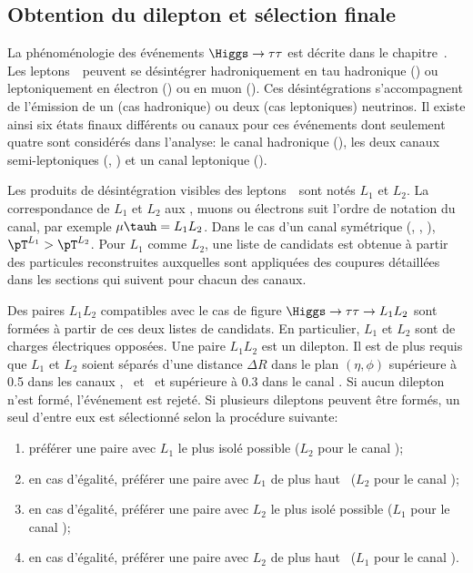 \subsection{Obtention du dilepton et sélection finale}\label{chapter-HTT_analysis-section-offline_selection}
La phénoménologie des événements $\Higgs\to\tau\tau$ est décrite dans le chapitre~.
Les leptons~\tau\ peuvent se désintégrer hadroniquement en tau hadronique (\tauh) ou leptoniquement en électron (\ele) ou en muon (\mu).
Ces désintégrations s'accompagnent de l'émission de un (cas hadronique) ou deux (cas leptoniques) neutrinos.
Il existe ainsi six états finaux différents ou canaux pour ces événements dont seulement quatre sont considérés dans l'analyse:
le canal hadronique (\tauh\tauh),
les deux canaux semi-leptoniques (\mu\tauh, \ele\tauh)
et un canal leptonique (\ele\mu).
\par
Les produits de désintégration visibles des leptons~\tau\ sont notés $L_1$ et $L_2$.
La correspondance de $L_1$ et $L_2$ aux \tauh, muons ou électrons suit l'ordre de notation du canal, par exemple $\mu\tauh=L_1L_2$.
Dans le cas d'un canal symétrique (\tauh\tauh, \mu\mu, \ele\ele), $\pT^{L_1}>\pT^{L_2}$.
Pour $L_1$ comme $L_2$, une liste de candidats est obtenue à partir des particules reconstruites auxquelles sont appliquées des coupures détaillées dans les sections qui suivent pour chacun des canaux.
\par
Des paires $L_1L_2$ compatibles avec le cas de figure $\Higgs\to\tau\tau\to L_1L_2$ sont formées
à partir de ces deux listes de candidats.
En particulier, $L_1$ et $L_2$ sont de charges électriques opposées.
Une paire $L_1L_2$ est un dilepton.
Il est de plus requis que $L_1$ et $L_2$ soient séparés d'une distance $\Delta R$ dans le plan $(\eta,\phi)$ 
supérieure à \num{0.5} dans les canaux \tauh\tauh, \mu\tauh\ et \ele\tauh\
et
supérieure à \num{0.3} dans le canal \ele\mu.
Si aucun dilepton n'est formé, l'événement est rejeté.
Si plusieurs dileptons peuvent être formés,
un seul d'entre eux est sélectionné selon la procédure suivante:
\begin{enumerate}
    \item préférer une paire avec $L_1$ le plus isolé possible ($L_2$ pour le canal \ele\mu);
    \item en cas d'égalité, préférer une paire avec $L_1$ de plus haut \pT\ ($L_2$ pour le canal \ele\mu);
    \item en cas d'égalité, préférer une paire avec $L_2$ le plus isolé possible ($L_1$ pour le canal \ele\mu);
    \item en cas d'égalité, préférer une paire avec $L_2$ de plus haut \pT\ ($L_1$ pour le canal \ele\mu).
\end{enumerate}
